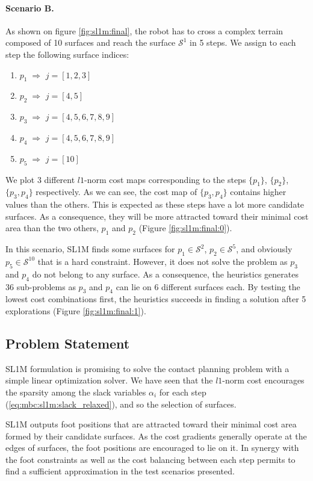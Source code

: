 \paragraph{Scenario B.}
As shown on figure \ref{fig:sl1m:final}, the robot has to cross a complex terrain composed of 10 surfaces and reach the surface $\mathcal{S}^1$ in 5 steps. We assign to each step the following surface indices:
\begin{enumerate}
    \item $p_1 \; \Rightarrow$ \; $j = [1,2,3]$
    \item $p_2 \; \Rightarrow$ \; $j = [4,5]$
    \item $p_3 \; \Rightarrow$ \; $j = [4,5,6,7,8,9]$
    \item $p_4 \; \Rightarrow$ \; $j = [4,5,6,7,8,9]$
    \item $p_5 \; \Rightarrow$ \; $j = [10]$
\end{enumerate}
We plot 3 different $l1$-norm cost maps corresponding to the steps $\{p_1\}$, $\{p_2\}$, $\{p_3,p_4\}$ respectively.
As we can see, the cost map of $\{p_3,p_4\}$ contains higher values than the others. This is expected as these steps have a lot more candidate surfaces. As a consequence, they will be more attracted toward their minimal cost area than the two others, $p_1$ and $p_2$ (Figure \ref{fig:sl1m:final:0}).

In this scenario, SL1M finds some surfaces for $p_1 \in \mathcal{S}^2$, $p_2 \in \mathcal{S}^5$, and obviously $p_5 \in \mathcal{S}^{10}$ that is a hard constraint. However, it does not solve the problem as $p_3$ and $p_4$ do not belong to any surface.
As a consequence, the heuristics generates 36 sub-problems as $p_3$ and $p_4$ can lie on 6 different surfaces each. By testing the lowest cost combinations first, the heuristics succeeds in finding a solution after 5 explorations (Figure \ref{fig:sl1m:final:1}).

\subsection{Problem Statement}
SL1M formulation is promising to solve the contact planning problem with a simple linear optimization solver.
We have seen that the $l1$-norm cost encourages the sparsity among the slack variables $\alpha_i$ for each step (\ref{eq:mbc:sl1m:slack_relaxed}), and so the selection of surfaces.

SL1M outputs foot positions that are attracted toward their minimal cost area formed by their candidate surfaces.
As the cost gradients generally operate at the edges of surfaces, the foot positions are encouraged to lie on it.
In synergy with the foot constraints as well as the cost balancing between each step permits to find a sufficient approximation in the test scenarios presented.

